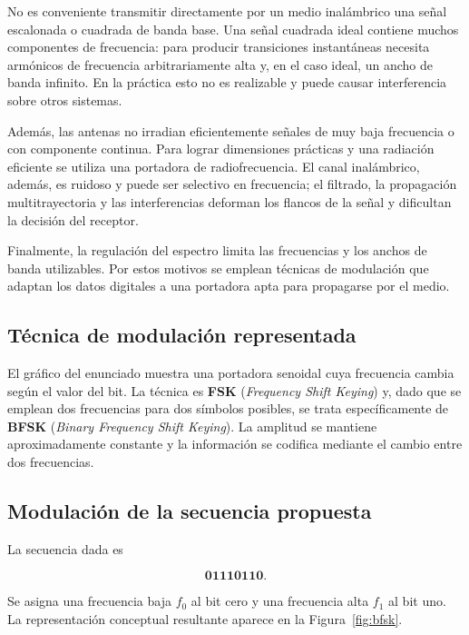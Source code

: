 ﻿\documentclass[12pt,a4paper]{article}
\begin{document}
No es conveniente transmitir directamente por un medio inalámbrico una señal
escalonada o cuadrada de banda base. Una señal cuadrada ideal contiene muchos
componentes de frecuencia: para producir transiciones instantáneas necesita
armónicos de frecuencia arbitrariamente alta y, en el caso ideal, un ancho de
banda infinito. En la práctica esto no es realizable y puede causar
interferencia sobre otros sistemas.

Además, las antenas no irradian eficientemente señales de muy baja frecuencia o
con componente continua. Para lograr dimensiones prácticas y una radiación
eficiente se utiliza una portadora de radiofrecuencia. El canal inalámbrico,
además, es ruidoso y puede ser selectivo en frecuencia; el filtrado, la
propagación multitrayectoria y las interferencias deforman los flancos de la
señal y dificultan la decisión del receptor.

Finalmente, la regulación del espectro limita las frecuencias y los anchos de
banda utilizables. Por estos motivos se emplean técnicas de modulación que
adaptan los datos digitales a una portadora apta para propagarse por el medio.

\subsection{Técnica de modulación representada}

El gráfico del enunciado muestra una portadora senoidal cuya frecuencia cambia
según el valor del bit. La técnica es \textbf{FSK} (\emph{Frequency Shift
Keying}) y, dado que se emplean dos frecuencias para dos símbolos posibles, se
trata específicamente de \textbf{BFSK} (\emph{Binary Frequency Shift Keying}).
La amplitud se mantiene aproximadamente constante y la información se codifica
mediante el cambio entre dos frecuencias.

\subsection{Modulación de la secuencia propuesta}

La secuencia dada es

\[
\mathbf{01110110}.
\]

Se asigna una frecuencia baja $f_0$ al bit cero y una frecuencia alta $f_1$ al
bit uno. La representación conceptual resultante aparece en la
Figura~\ref{fig:bfsk}.
\end{document}
